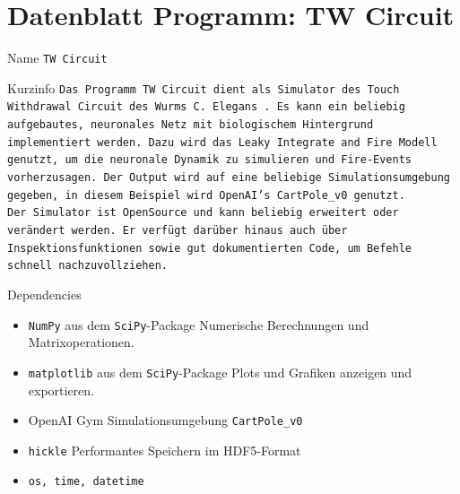\chapter{Datenblatt Programm: TW Circuit}
%
\label{app:datenblatt}
\enlargethispage{2\baselineskip}
\begin{minipage}[b]{0.61\textwidth}
	\begin{mybox}{Name}
		\texttt{TW Circuit}
	\end{mybox}
	\begin{mybox}{Kurzinfo}
		\texttt{Das Programm TW Circuit dient als Simulator des Touch Withdrawal Circuit des Wurms C. Elegans \cite{WormLevelRL}. Es kann ein beliebig aufgebautes, neuronales Netz mit biologischem Hintergrund implementiert werden. Dazu wird das Leaky Integrate and Fire Modell genutzt, um die neuronale Dynamik zu simulieren und Fire-Events vorherzusagen. Der Output wird auf eine beliebige Simulationsumgebung gegeben, in diesem Beispiel wird OpenAI's CartPole\_v0 genutzt.\\ Der Simulator ist OpenSource und kann beliebig erweitert oder verändert werden. Er verfügt darüber hinaus auch über Inspektionsfunktionen sowie gut dokumentierten Code, um Befehle schnell nachzuvollziehen.}
	\end{mybox}
	\begin{mybox}{Dependencies}
		\begin{itemize}
			\item \texttt{NumPy} aus dem \texttt{SciPy}-Package
			\subitem Numerische Berechnungen und Matrixoperationen.
			\item \texttt{matplotlib} aus dem \texttt{SciPy}-Package
			\subitem Plots und Grafiken anzeigen und exportieren.
			\item OpenAI Gym
			\subitem Simulationsumgebung \texttt{CartPole\_v0}
			\item \texttt{hickle}
			\subitem Performantes Speichern im HDF5-Format
			\item \texttt{os, time, datetime}
		\end{itemize}
	\end{mybox}
\end{minipage}

